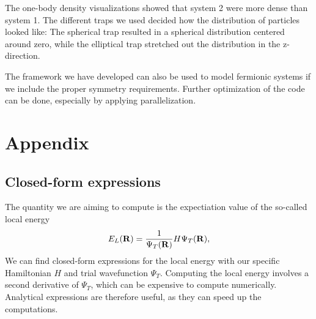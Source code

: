 \documentclass[english, a4paper]{article}
\begin{document}
The one-body density visualizations showed that system 2 were more dense than system 1. The different traps we used
decided how the distribution of particles looked like: The spherical trap resulted in a spherical distribution
centered around zero, while the elliptical trap stretched out the distribution in the z-direction. 

The framework we have developed can also be used to model fermionic systems if we include the proper
symmetry requirements. Further optimization of the code can be done, especially by applying parallelization. 




\section{Appendix}

\subsection{Closed-form expressions}

The quantity we are aiming to compute is the expectiation value of the so-called local energy
 \begin{equation}
    E_L({\bf R})=\frac{1}{\Psi_T({\bf R})}H\Psi_T({\bf R}),
    \label{localenergy}
 \end{equation}
We can find closed-form expressions for the local energy with our specific Hamiltonian $H$ and trial wavefunction $\Psi_T$.
Computing the local energy involves a second derivative of $\Psi_T$, which can be expensive to compute numerically. 
Analytical expressions are therefore useful, as they can speed up the computations.\\
\end{document}
